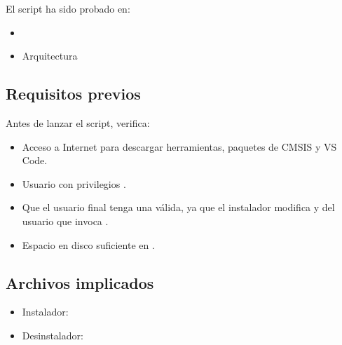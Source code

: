 \documentclass[letterpaper,10pt,english]{sphinxmanual}
\begin{document}
\sphinxAtStartPar
El script ha sido probado en:
\begin{itemize}
\item {} 
\sphinxAtStartPar
{}

\item {} 
\sphinxAtStartPar
Arquitectura 

\end{itemize}


\subsection{Requisitos previos}
\label{\detokenize{vscode:requisitos-previos}}
\sphinxAtStartPar
Antes de lanzar el script, verifica:
\begin{itemize}
\item {} 
\sphinxAtStartPar
Acceso a Internet para descargar herramientas, paquetes de CMSIS y VS Code.

\item {} 
\sphinxAtStartPar
Usuario con privilegios .

\item {} 
\sphinxAtStartPar
Que el usuario final tenga una  válida, ya que el instalador modifica
 y  del usuario que invoca
.

\item {} 
\sphinxAtStartPar
Espacio en disco suficiente en .

\end{itemize}


\subsection{Archivos implicados}
\label{\detokenize{vscode:archivos-implicados}}\begin{itemize}
\item {} 
\sphinxAtStartPar
Instalador: 

\item {} 
\sphinxAtStartPar
Desinstalador: 

\end{itemize}
\end{document}
